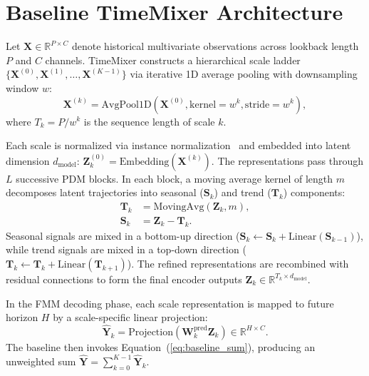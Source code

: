 \documentclass[journal]{IEEEtran}
\begin{document}
\section{Baseline TimeMixer Architecture}
\label{sec:baseline}

Let $\mathbf{X} \in \mathbb{R}^{P \times C}$ denote historical multivariate observations across lookback length $P$ and $C$ channels. TimeMixer constructs a hierarchical scale ladder $\{\mathbf{X}^{(0)}, \mathbf{X}^{(1)}, \dots, \mathbf{X}^{(K-1)}\}$ via iterative 1D average pooling with downsampling window $w$:
\begin{equation}
\mathbf{X}^{(k)} = \text{AvgPool1D}\left(\mathbf{X}^{(0)}, \text{kernel}=w^k, \text{stride}=w^k\right),
\end{equation}
where $T_k = P / w^k$ is the sequence length of scale $k$.

Each scale is normalized via instance normalization~\cite{kim2021reversible} and embedded into latent dimension $d_{\text{model}}$: $\mathbf{Z}_k^{(0)} = \text{Embedding}(\mathbf{X}^{(k)})$. The representations pass through $L$ successive PDM blocks. In each block, a moving average kernel of length $m$ decomposes latent trajectories into seasonal ($\mathbf{S}_k$) and trend ($\mathbf{T}_k$) components:
\begin{align}
\mathbf{T}_k &= \text{MovingAvg}(\mathbf{Z}_k, m), \\
\mathbf{S}_k &= \mathbf{Z}_k - \mathbf{T}_k.
\end{align}
Seasonal signals are mixed in a bottom-up direction ($\mathbf{S}_k \leftarrow \mathbf{S}_k + \text{Linear}(\mathbf{S}_{k-1})$), while trend signals are mixed in a top-down direction ($\mathbf{T}_k \leftarrow \mathbf{T}_k + \text{Linear}(\mathbf{T}_{k+1})$). The refined representations are recombined with residual connections to form the final encoder outputs $\mathbf{Z}_k \in \mathbb{R}^{T_k \times d_{\text{model}}}$.

In the FMM decoding phase, each scale representation is mapped to future horizon $H$ by a scale-specific linear projection:
\begin{equation}
\hat{\mathbf{Y}}_k = \text{Projection}\left(\mathbf{W}_k^{\text{pred}} \mathbf{Z}_k\right) \in \mathbb{R}^{H \times C}.
\end{equation}
The baseline then invokes Equation~(\ref{eq:baseline_sum}), producing an unweighted sum $\hat{\mathbf{Y}} = \sum_{k=0}^{K-1} \hat{\mathbf{Y}}_k$.
\end{document}
